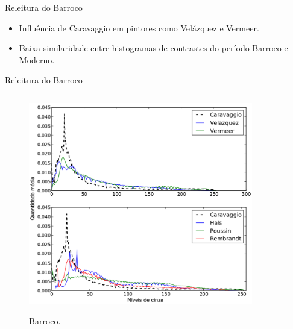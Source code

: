 \documentclass{beamer}
\begin{document}
\begin{frame}{Releitura do Barroco}

  \begin{itemize}
    \item Influência de Caravaggio em
      pintores como Velázquez e Vermeer.

    \item Baixa similaridade entre histogramas de contrastes do período Barroco e Moderno.
    \end{itemize}

\end{frame}


\begin{frame}{Releitura do Barroco}

\begin{columns}
 \begin{column}{.4\textwidth}
  \begin{figure}[h!]
\begin{center}
  { \centering \includegraphics[width=\columnwidth]{figs/chiaroscuro2}}
      \caption{Barroco.} \label{fig:chiaroscuro}
        \end{center}
\end{figure}
 \end{column}

 \begin{column}{.6\textwidth}
 \begin{figure}[h!]
    

\end{figure}
\end{column}
\end{columns}
\end{frame}
\end{document}
